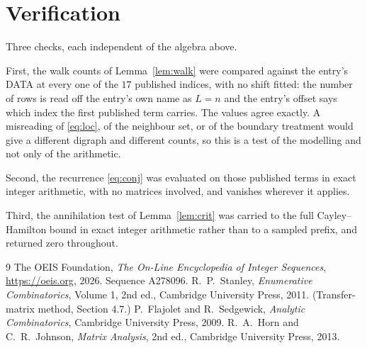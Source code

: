 \documentclass[11pt,a4paper]{article}
\theoremstyle{plain}
\theoremstyle{definition}
\begin{document}
\section{Verification}

Three checks, each independent of the algebra above.

First, the walk counts of Lemma~\ref{lem:walk} were compared against the entry's DATA at
every one of the $17$ published indices, with no shift fitted: the number of rows is
read off the entry's own name as $L=n$ and the entry's offset says which index the first
published term carries. The values agree exactly. A misreading of \eqref{eq:loc}, of the
neighbour set, or of the boundary treatment would give a different digraph and different
counts, so this is a test of the modelling and not only of the arithmetic.

Second, the recurrence \eqref{eq:conj} was evaluated on those published terms in exact
integer arithmetic, with no matrices involved, and vanishes wherever it applies.

Third, the annihilation test of Lemma~\ref{lem:crit} was carried to the full
Cayley--Hamilton bound in exact integer arithmetic rather than to a sampled prefix, and
returned zero throughout.

\begin{thebibliography}{9}
 The OEIS Foundation, \emph{The On-Line Encyclopedia of Integer
Sequences}, \url{https://oeis.org}, 2026. Sequence A278096.
 R.~P.~Stanley, \emph{Enumerative Combinatorics}, Volume 1, 2nd ed.,
Cambridge University Press, 2011. (Transfer-matrix method, Section 4.7.)
 P.~Flajolet and R.~Sedgewick, \emph{Analytic Combinatorics}, Cambridge
University Press, 2009.
 R.~A.~Horn and C.~R.~Johnson, \emph{Matrix Analysis}, 2nd ed., Cambridge
University Press, 2013.
\end{thebibliography}
\end{document}
